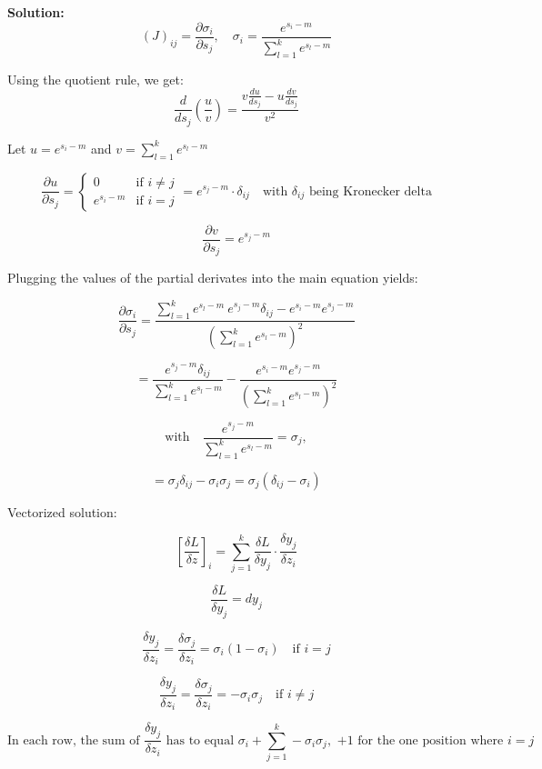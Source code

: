 \documentclass{article}
\newenvironment{solution}{\color{blue} \smallskip \textbf{Solution:}}{}
\begin{document}
\begin{solution}
    \begin{equation}
    (J)_{ij} = \frac{\partial \sigma_i}{\partial s_j}, \quad \sigma_i = \frac{e^{s_i - m}}{\sum_{l=1}^k e^{s_l - m}}
\end{equation}

Using the quotient rule, we get:
\[
\frac{d}{ds_j} \left( \frac{u}{v} \right) = \frac{v \frac{du}{ds_j} - u \frac{dv}{ds_j}}{v^2}
\]

Let \( u = e^{s_i - m} \) and \( v = \sum_{l=1}^k e^{s_l - m} \)

\[
\frac{\partial u}{\partial s_j} = \begin{cases} 
    0 & \text{if } i \neq j \\
    e^{s_i - m} & \text{if } i = j
\end{cases} = e^{s_j - m} \cdot \delta_{ij} \quad \text{with } \delta_{ij} \text{ being Kronecker delta}
\]

\[
\frac{\partial v}{\partial s_j} = e^{s_j - m}
\]

Plugging the values of the partial derivates into the main equation yields:

\[
\frac{\partial \sigma_i}{\partial s_j} = \frac{\sum_{l=1}^k e^{s_l - m} \ e^{s_j - m} \delta_{ij} - e^{s_i - m} e^{s_j - m}}{ \left( \sum_{l=1}^k e^{s_l - m} \right)^2}
\]

\[
= \frac{e^{s_j - m} \delta_{ij}}{\sum_{l=1}^k e^{s_l - m}} - \frac{e^{s_i - m} e^{s_j - m}}{\left( \sum_{l=1}^k e^{s_l - m} \right)^2}
\]

\[
\text{with} \quad  \frac{e^{s_j - m}}{\sum_{l=1}^k e^{s_l - m}} = \sigma_j,
\]

\[
= \sigma_j \delta_{ij} - \sigma_i \sigma_j = \sigma_j (\delta_{ij} - \sigma_i)
\]

Vectorized solution:


\[
\left[ \frac{\delta L}{\delta z} \right]_i = \sum_{j=1}^k \frac{\delta L}{\delta y_j} \cdot \frac{\delta y_j}{\delta z_i}
\]

\[
\frac{\delta L}{\delta y_j} = d y_j
\]

\[
\frac{\delta y_j}{\delta z_i} = \frac{\delta \sigma_j}{\delta z_i} = \sigma_i (1 - \sigma_i) \quad \text{if } i = j
\]

\[
\frac{\delta y_j}{\delta z_i} = \frac{\delta \sigma_j}{\delta z_i} = -\sigma_i \sigma_j \quad \text{if } i \neq j
\]

\[
\text{In each row, the sum of } \frac{\delta y_j}{\delta z_i} \text{ has to equal } \sigma_i + \sum_{j=1}^k -\sigma_i \sigma_j, \text{ +1 for the one position where } i = j
\]


\end{solution}
\end{document}
